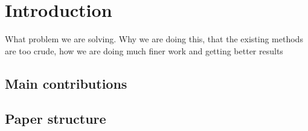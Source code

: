 \section{Introduction}
What problem we are solving. Why we are doing this, that the existing methods are too crude, how we are doing much finer work and getting better results
\subsection{Main contributions}
\subsection{Paper structure}
